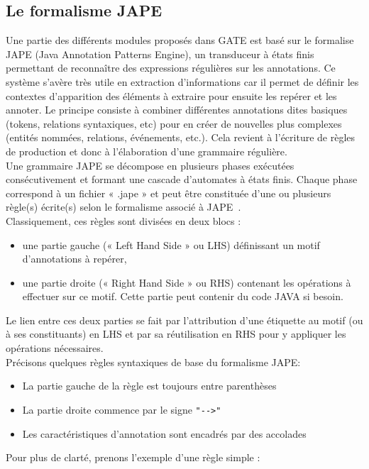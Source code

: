 \documentclass[a4paper, 11pt]{report}
\begin{document}
\subsection{Le formalisme JAPE}
Une partie des différents modules proposés dans GATE est basé sur le formalise JAPE (Java Annotation Patterns Engine), un transduceur à états finis permettant de reconnaître des expressions régulières sur les annotations. Ce système s'avère très utile en extraction d'informations car il permet de définir les contextes d'apparition des éléments à extraire pour ensuite les repérer et les annoter. Le principe consiste à combiner différentes annotations dites basiques (tokens, relations syntaxiques, etc) pour en créer de nouvelles plus complexes (entités nommées, relations, événements, etc.). Cela revient à l'écriture de règles de production et donc à l'élaboration d'une grammaire régulière.\\
Une grammaire JAPE se décompose en plusieurs phases exécutées consécutivement et formant une cascade d'automates à états finis. Chaque phase correspond à un fichier « .jape » et peut être constituée d'une ou plusieurs règle(s) écrite(s) selon le formalisme associé à JAPE~\cite{SL10}.\\
Classiquement, ces règles sont divisées en deux blocs : 
\begin{itemize}
\item une partie gauche (« Left Hand Side » ou LHS) définissant un motif d'annotations à repérer,
\item une partie droite (« Right Hand Side » ou RHS) contenant les opérations à effectuer sur ce motif. Cette partie peut contenir du code JAVA si besoin.
\end{itemize}
Le lien entre ces deux parties se fait par l'attribution d'une étiquette au motif (ou à ses constituants) en LHS et par sa réutilisation en RHS pour y appliquer les opérations nécessaires.\\
Précisons quelques règles syntaxiques de base du formalisme JAPE:
\begin{itemize}
    \item La partie gauche de la règle est toujours entre parenthèses
    \item La partie droite commence par le signe \verb|"-->"|
    \item Les caractéristiques d'annotation sont encadrés par des accolades
\end{itemize}
Pour plus de clarté, prenons l'exemple d'une règle simple :\\
\end{document}
